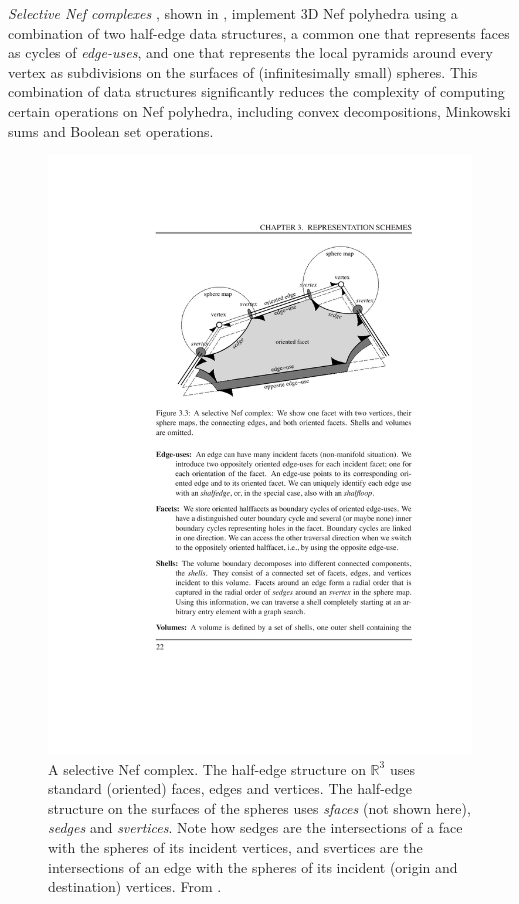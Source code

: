 \emph{Selective Nef complexes} \citep{Hachenberger06}, shown in , implement 3D Nef polyhedra using a combination of two half-edge data structures, a common one that represents faces as cycles of \emph{edge-uses}, and one that represents the local pyramids around every vertex as subdivisions on the surfaces of (infinitesimally small) spheres.
This combination of data structures significantly reduces the complexity of computing certain operations on Nef polyhedra, including convex decompositions, Minkowski sums and Boolean set operations.
\begin{figure}[tbp]
\includegraphics[width=\linewidth]{figs/snc}
\caption[A selective Nef complex]{A selective Nef complex. The half-edge structure on $\mathbb{R}^3$ uses standard (oriented) faces, edges and vertices. The half-edge structure on the surfaces of the spheres uses \emph{sfaces} (not shown here), \emph{sedges} and \emph{svertices}. Note how sedges are the intersections of a face with the spheres of its incident vertices, and svertices are the intersections of an edge with the spheres of its incident (origin and destination) vertices. From \citet{Hachenberger06}.}
\label{fig:snc}
\end{figure}

